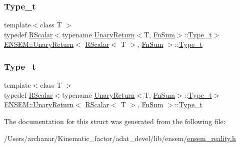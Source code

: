 \subsubsection{\texorpdfstring{Type\_t}{Type\_t}\hspace{0.1cm}{\footnotesize\ttfamily [1/2]}}
{\footnotesize\ttfamily template$<$class T $>$ \\
typedef \mbox{\hyperlink{classENSEM_1_1RScalar}{R\+Scalar}}$<$typename \mbox{\hyperlink{structENSEM_1_1UnaryReturn}{Unary\+Return}}$<$T, \mbox{\hyperlink{structENSEM_1_1FnSum}{Fn\+Sum}}$>$\+::\mbox{\hyperlink{structENSEM_1_1UnaryReturn_3_01RScalar_3_01T_01_4_00_01FnSum_01_4_aca06bc5e18b4787990a7e7bd5e72d38c}{Type\+\_\+t}}$>$ \mbox{\hyperlink{structENSEM_1_1UnaryReturn}{E\+N\+S\+E\+M\+::\+Unary\+Return}}$<$ \mbox{\hyperlink{classENSEM_1_1RScalar}{R\+Scalar}}$<$ T $>$, \mbox{\hyperlink{structENSEM_1_1FnSum}{Fn\+Sum}} $>$\+::\mbox{\hyperlink{structENSEM_1_1UnaryReturn_3_01RScalar_3_01T_01_4_00_01FnSum_01_4_aca06bc5e18b4787990a7e7bd5e72d38c}{Type\+\_\+t}}}

\mbox{\label{structENSEM_1_1UnaryReturn_3_01RScalar_3_01T_01_4_00_01FnSum_01_4_aca06bc5e18b4787990a7e7bd5e72d38c}} 
\subsubsection{\texorpdfstring{Type\_t}{Type\_t}\hspace{0.1cm}{\footnotesize\ttfamily [2/2]}}
{\footnotesize\ttfamily template$<$class T $>$ \\
typedef \mbox{\hyperlink{classENSEM_1_1RScalar}{R\+Scalar}}$<$typename \mbox{\hyperlink{structENSEM_1_1UnaryReturn}{Unary\+Return}}$<$T, \mbox{\hyperlink{structENSEM_1_1FnSum}{Fn\+Sum}}$>$\+::\mbox{\hyperlink{structENSEM_1_1UnaryReturn_3_01RScalar_3_01T_01_4_00_01FnSum_01_4_aca06bc5e18b4787990a7e7bd5e72d38c}{Type\+\_\+t}}$>$ \mbox{\hyperlink{structENSEM_1_1UnaryReturn}{E\+N\+S\+E\+M\+::\+Unary\+Return}}$<$ \mbox{\hyperlink{classENSEM_1_1RScalar}{R\+Scalar}}$<$ T $>$, \mbox{\hyperlink{structENSEM_1_1FnSum}{Fn\+Sum}} $>$\+::\mbox{\hyperlink{structENSEM_1_1UnaryReturn_3_01RScalar_3_01T_01_4_00_01FnSum_01_4_aca06bc5e18b4787990a7e7bd5e72d38c}{Type\+\_\+t}}}



The documentation for this struct was generated from the following file\+:\begin{DoxyCompactItemize}
\item 
/\+Users/archanar/\+Kinematic\+\_\+factor/adat\+\_\+devel/lib/ensem/\mbox{\hyperlink{lib_2ensem_2ensem__reality_8h}{ensem\+\_\+reality.\+h}}\end{DoxyCompactItemize}
